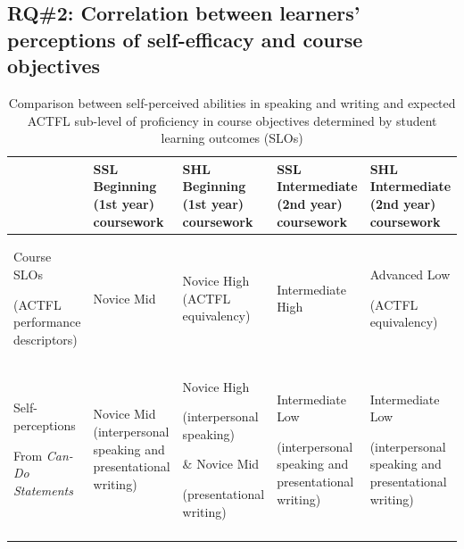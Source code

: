 \documentclass[output=paper]{langscibook}
\begin{document}
\subsection{RQ\#2: Correlation between learners’ perceptions of self-efficacy and course objectives}

\begin{table}
\small
\caption{Comparison between self-perceived abilities in speaking and writing and expected ACTFL sub-level of proficiency in course objectives determined by student learning outcomes (SLOs)}
\label{tab:3:3}
\begin{tabularx}{\textwidth}{Q@{~~}Q@{~~}QQQ}
\lsptoprule
& SSL Beginning (1st year) coursework & SHL Beginning (1st year) coursework & SSL Intermediate (2nd year) coursework & SHL Intermediate (2nd year) coursework \\
\midrule
Course SLOs

(ACTFL performance descriptors) & Novice Mid & Novice High (ACTFL equivalency) & {Intermediate High} & {Advanced Low}

 (ACTFL equivalency)\\
 \tablevspace

Self-perceptions

From \textit{Can-Do Statements} & Novice Mid (interpersonal speaking and presentational writing) & {Novice High}

{(interpersonal speaking)}

 \& Novice Mid

 (presentational writing) & {Intermediate Low}

 (interpersonal speaking and presentational writing) & {Intermediate Low}

 (interpersonal speaking and presentational writing)\\
\lspbottomrule
\end{tabularx}
\end{table}
\end{document}
